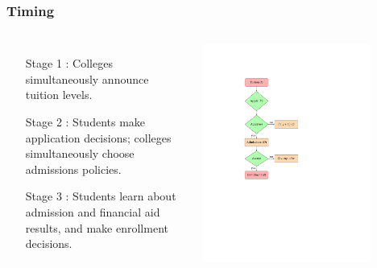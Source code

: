 \documentclass[10pt]{beamer}
\begin{document}
\begin{frame}[c]\frametitle{Timing}
\begin{columns}
\begin{enumerate}
    \item[Stage 1]: Colleges simultaneously announce tuition levels.
    \item[Stage 2]: Students make application decisions; colleges simultaneously choose admissions policies.
    \item[Stage 3]: Students learn about admission and financial aid results, and make enrollment decisions.
\end{enumerate}
\centerline{\includegraphics[width=0.8\textwidth]{flowchartx.pdf}}
\end{columns}


\end{frame}
\end{document}
